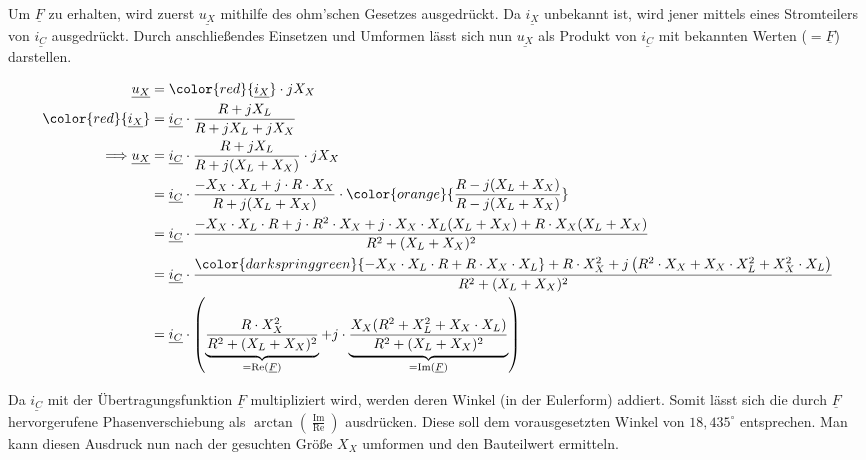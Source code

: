 \documentclass[11pt]{scrartcl}
\begin{document}
Um $\underline{F}$ zu erhalten, wird zuerst $\underline{u_{X}}$ mithilfe des ohm'schen Gesetzes ausgedrückt. Da $\underline{i_{X}}$ unbekannt ist, wird jener mittels eines Stromteilers von $\underline{i_{C}}$ ausgedrückt. Durch anschließendes Einsetzen und Umformen lässt sich nun $\underline{u_{X}}$ als Produkt von $\underline{i_{C}}$ mit bekannten Werten ($=\underline{F}$) darstellen.

\begin{align*}
  \underline{u_{X}} &= {\color{red}{\underline{i_{X}}}} \cdot j X_{X} \\
  {\color{red}{\underline{i_{X}}}} &= \underline{i_{C}}\cdot  \frac{R + j X_{L}}{R + j X_{L} + j X_{X}} \\
  \Longrightarrow \underline{u_{X}} &= \underline{i_{C}} \cdot \frac{R + j X_{L}}{R + j (X_{L} + X_{X})} \cdot j X_{X} \\
                    &= \underline{i_{C}} \cdot \frac{-X_{X} \cdot X_{L} + j\cdot R \cdot X_{X}}{R + j (X_{L} + X_{X})} \cdot {\color{orange}{\frac{R-j(X_{L} + X_{X})}{R-j(X_{L} + X_{X})}}} \\
                    &= \underline{i_{C}} \cdot \frac{-X_{X} \cdot X_{L} \cdot R + j \cdot R^{2} \cdot X_{X} + j \cdot X_{X} \cdot X_{L} (X_{L} + X_{X}) + R \cdot X_{X} (X_{L} + X_{X})}{R^{2} + (X_{L} + X_{X})^{2}} \\
                    &= \underline{i_{C}} \cdot \frac{{\color{darkspringgreen}{-X_{X} \cdot X_{L} \cdot R + R \cdot X_{X} \cdot X_{L}}} + R \cdot X_{X}^{2} + j \left( R^{2} \cdot X_{X} + X_{X} \cdot X_{L}^{2} + X_{X}^{2} \cdot X_{L}\right)}{R^{2} + (X_{L} + X_{X})^{2}} \\
                      &= \underline{i_{C}} \cdot \left(\underbrace{\frac{R \cdot X_{X}^{2}}{R^{2} + (X_{L} + X_{X})^{2}}}_{=\operatorname{Re} (\underline{F})} + j \cdot \underbrace{\frac{X_{X} (R^{2} + X_{L}^{2} + X_{X} \cdot X_{L})}{R^{2} + (X_{L} + X_{X})^{2}}}_{=\operatorname{Im} (\underline{F})} \right)
\end{align*}

Da $\underline{i_{C}}$ mit der Übertragungsfunktion $\underline{F}$ multipliziert wird, werden deren Winkel (in der Eulerform) addiert. Somit lässt sich die durch $\underline{F}$ hervorgerufene Phasenverschiebung als \(\arctan\left( \frac{\operatorname{Im}}{\operatorname{Re}}\right)\) ausdrücken. Diese soll dem vorausgesetzten Winkel von $18,435^{\circ}$ entsprechen. Man kann diesen Ausdruck nun nach der gesuchten Größe $X_{X}$ umformen und den Bauteilwert ermitteln.
\end{document}
